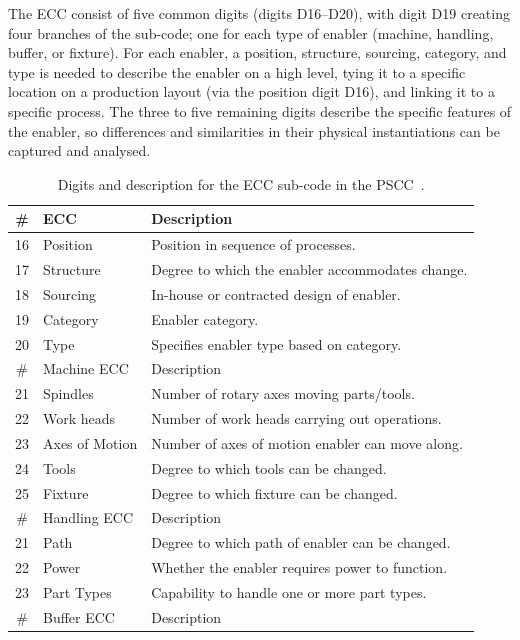 The ECC consist of five common digits (digits D16--D20), with digit D19 creating four branches of the sub-code; one for each type of enabler (machine, handling, buffer, or fixture).
For each enabler, a position, structure, sourcing, category, and type is needed to describe the enabler on a high level, tying it to a specific location on a production layout (via the position digit D16), and linking it to a specific process.
The three to five remaining digits describe the specific features of the enabler, so differences and similarities in their physical instantiations can be captured and analysed.
\begin{table}[tb]
  \centering
  \caption[Digits and description for the ECC sub-code in the PSCC.]
  {Digits and description for the ECC sub-code in the PSCC~\parencite{SorensenClsfCoding}.}\label{tab:PSCC_ECC}
  \small
  \begin{tabular}{cll}
    \toprule
    \# & ECC & Description\\
    \midrule
    16 & Position & Position in sequence of processes.\\
    17 & Structure & Degree to which the enabler accommodates change.\\
    18 & Sourcing & In-house or contracted design of enabler.\\
    19 & Category & Enabler category.\\
    20 & Type & Specifies enabler type based on category.\\
    \midrule
    \# & Machine ECC & Description\\
    \midrule
    21 & Spindles & Number of rotary axes moving parts/tools.\\
    22 & Work heads & Number of work heads carrying out operations.\\
    23 & Axes of Motion & Number of axes of motion enabler can move along.\\
    24 & Tools & Degree to which tools can be changed.\\
    25 & Fixture & Degree to which fixture can be changed.\\
    \midrule
    \# & Handling ECC & Description\\
    \midrule
    21 & Path & Degree to which path of enabler can be changed.\\
    22 & Power & Whether the enabler requires power to function.\\
    23 & Part Types & Capability to handle one or more part types.\\
    \midrule
    \# & Buffer ECC & Description\\

\end{tabular}
\end{table}
